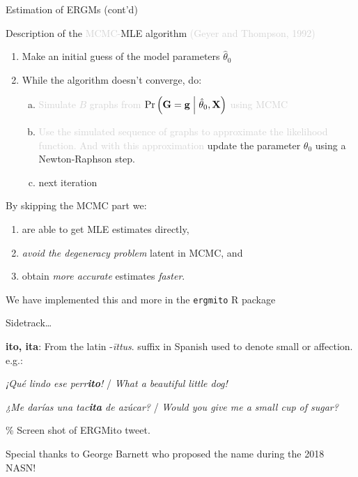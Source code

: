 \documentclass[10pt,ignorenonframetext,aspectratio=169,]{beamer}
\newcommand{\Prcond}[2]{{\mbox{Pr}\left(#1\vphantom{#2}\;\right|\left.\vphantom{#1}#2\right)}}
\newcommand{\Graph}{\mathbf{G}}
\newcommand{\graph}{\mathbf{g}}
\newcommand{\Indepvar}{\mathbf{X}}
\begin{document}
\begin{frame}[fragile,t]{Estimation of
ERGMs (cont'd)}
\protect\hypertarget{estimation-of-ergms-contd-1}{}

Description of the
\textcolor<2->{lightgray}{MCMC-}\textcolor<2->{USCCardinal}{MLE}
algorithm \textcolor<2->{lightgray}{(Geyer and Thompson, 1992)}

\begin{enumerate}
\item
  Make an initial guess of the model parameters \(\hat\theta_0\)
\item
  While the algorithm doesn't converge, do:

  \begin{enumerate}
  [a.]
  \item
    \textcolor<2->{lightgray}{Simulate $B$ graphs from $\Prcond{\Graph = \graph}{\hat\theta_0, \Indepvar}$ using MCMC}
  \item
    \textcolor<2->{lightgray}{Use the simulated sequence of graphs to approximate the likelihood function. And with this approximation}
    \textcolor<2->{USCCardinal}{update the parameter $\theta_0$ using a Newton-Raphson step}.
  \item
    next iteration\pause\pause
  \end{enumerate}
\end{enumerate}

By skipping the MCMC part we:\pause

\begin{enumerate}
\item
  are able to get MLE estimates directly,\pause
\item
  \emph{avoid the degeneracy problem} latent in MCMC, and\pause
\item
  obtain \emph{more accurate} estimates \emph{faster}. \pause
\end{enumerate}

We have implemented this and more in the \texttt{ergmito} R package

\end{frame}

\begin{frame}

Sidetrack\ldots{}

\begin{minipage}[c]{1\linewidth}
\large \textbf{ito, ita}: From the latin -\textit{\=ittus}. suffix in Spanish used to denote small or affection. e.g.:

\hspace{.5cm} \textit{¡Qué lindo ese perr\textcolor{USCCardinal}{\textbf{ito}}!} / \textit{What a beautiful little dog!}

\hspace{.5cm} \textit{¿Me darías una tac\textcolor{USCCardinal}{\textbf{ita}} de azúcar?} / \textit{Would you give me a small cup of sugar?}
\normalsize
\end{minipage}\pause

\% Screen shot of ERGMito tweet.

\alert{Special thanks to George Barnett who proposed the name during the 2018 NASN!}

\end{frame}
\end{document}
